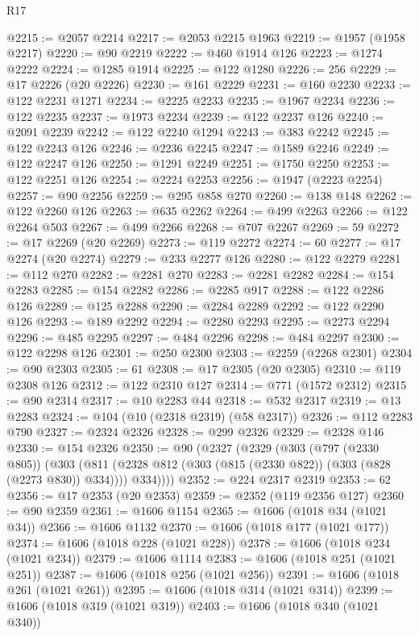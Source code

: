 \begin{lexlean}{R17}
\begin{coremodule}
{{{{{{{{{{{{{{{{{{{{{{{{{{{{{{{{{{{{{{{{{{{{{{{{{{{{{{{{{{{{{{{{{{{{{{{{{{{{{{{{{{{{{{{{{{{{{{{{{{{{{{{{{{{@2215 := @2057 @2214
@2217 := @2053 @2215 @1963
@2219 := @1957 (@1958 @2217)
@2220 := @90 @2219
@2222 := @460 @1914 @126
@2223 := @1274 @2222
@2224 := @1285 @1914
@2225 := @122 @1280
@2226 := 256
@2229 := @17 @2226 (@20 @2226)
@2230 := @161 @2229
@2231 := @160 @2230
@2233 := @122 @2231 @1271
@2234 := @2225 @2233
@2235 := @1967 @2234
@2236 := @122 @2235
@2237 := @1973 @2234
@2239 := @122 @2237 @126
@2240 := @2091 @2239
@2242 := @122 @2240 @1294
@2243 := @383 @2242
@2245 := @122 @2243 @126
@2246 := @2236 @2245
@2247 := @1589 @2246
@2249 := @122 @2247 @126
@2250 := @1291 @2249
@2251 := @1750 @2250
@2253 := @122 @2251 @126
@2254 := @2224 @2253
@2256 := @1947 (@2223 @2254)
@2257 := @90 @2256
@2259 := @295 @858 @270
@2260 := @138 @148
@2262 := @122 @2260 @126
@2263 := @635 @2262
@2264 := @499 @2263
@2266 := @122 @2264 @503
@2267 := @499 @2266
@2268 := @707 @2267
@2269 := 59
@2272 := @17 @2269 (@20 @2269)
@2273 := @119 @2272
@2274 := 60
@2277 := @17 @2274 (@20 @2274)
@2279 := @233 @2277 @126
@2280 := @122 @2279
@2281 := @112 @270
@2282 := @2281 @270
@2283 := @2281 @2282
@2284 := @154 @2283
@2285 := @154 @2282
@2286 := @2285 @917
@2288 := @122 @2286 @126
@2289 := @125 @2288
@2290 := @2284 @2289
@2292 := @122 @2290 @126
@2293 := @189 @2292
@2294 := @2280 @2293
@2295 := @2273 @2294
@2296 := @485 @2295
@2297 := @484 @2296
@2298 := @484 @2297
@2300 := @122 @2298 @126
@2301 := @250 @2300
@2303 := @2259 (@2268 @2301)
@2304 := @90 @2303
@2305 := 61
@2308 := @17 @2305 (@20 @2305)
@2310 := @119 @2308 @126
@2312 := @122 @2310 @127
@2314 := @771 (@1572 @2312)
@2315 := @90 @2314
@2317 := @10 @2283 @44
@2318 := @532 @2317
@2319 := @13 @2283
@2324 := @104 (@10 (@2318 @2319) (@58 @2317))
@2326 := @112 @2283 @790
@2327 := @2324 @2326
@2328 := @299 @2326
@2329 := @2328 @146
@2330 := @154 @2326
@2350 := @90
    (@2327
      (@2329
        (@303
          (@797 (@2330 @805))
          (@303
            (@811 (@2328 @812 (@303 (@815 (@2330 @822)) (@303 (@828 (@2273 @830)) @334))))
            @334))))
@2352 := @224 @2317 @2319
@2353 := 62
@2356 := @17 @2353 (@20 @2353)
@2359 := @2352 (@119 @2356 @127)
@2360 := @90 @2359
@2361 := @1606 @1154
@2365 := @1606 (@1018 @34 (@1021 @34))
@2366 := @1606 @1132
@2370 := @1606 (@1018 @177 (@1021 @177))
@2374 := @1606 (@1018 @228 (@1021 @228))
@2378 := @1606 (@1018 @234 (@1021 @234))
@2379 := @1606 @1114
@2383 := @1606 (@1018 @251 (@1021 @251))
@2387 := @1606 (@1018 @256 (@1021 @256))
@2391 := @1606 (@1018 @261 (@1021 @261))
@2395 := @1606 (@1018 @314 (@1021 @314))
@2399 := @1606 (@1018 @319 (@1021 @319))
@2403 := @1606 (@1018 @340 (@1021 @340))
}}}}}}}}}}}}}}}}}}}}}}}}}}}}}}}}}}}}}}}}}}}}}}}}}}}}}}}}}}}}}}}}}}}}}}}}}}}}}}}}}}}}}}}}}}}}}}}}}}}}}}}}}}}
\end{coremodule}
\end{lexlean}
